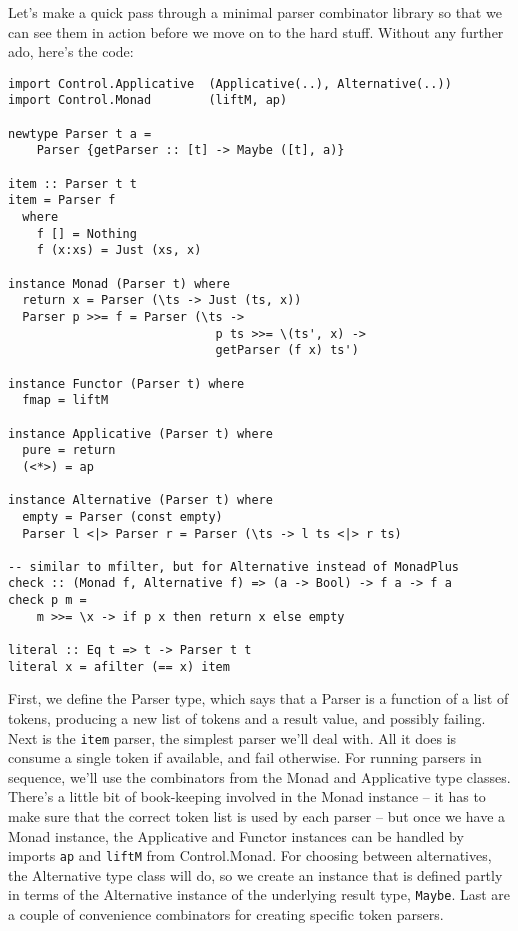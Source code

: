\documentclass{tmr}
\begin{document}
Let's make a quick pass through a minimal parser combinator library so that we
can see them in action before we move on to the hard stuff.  Without any 
further ado, here's the code:
\begin{verbatim}
import Control.Applicative  (Applicative(..), Alternative(..))
import Control.Monad        (liftM, ap)

newtype Parser t a = 
    Parser {getParser :: [t] -> Maybe ([t], a)}

item :: Parser t t
item = Parser f
  where 
    f [] = Nothing
    f (x:xs) = Just (xs, x)

instance Monad (Parser t) where
  return x = Parser (\ts -> Just (ts, x))
  Parser p >>= f = Parser (\ts ->
                             p ts >>= \(ts', x) ->
                             getParser (f x) ts')

instance Functor (Parser t) where
  fmap = liftM
  
instance Applicative (Parser t) where
  pure = return
  (<*>) = ap          

instance Alternative (Parser t) where
  empty = Parser (const empty)
  Parser l <|> Parser r = Parser (\ts -> l ts <|> r ts)

-- similar to mfilter, but for Alternative instead of MonadPlus
check :: (Monad f, Alternative f) => (a -> Bool) -> f a -> f a
check p m =
    m >>= \x -> if p x then return x else empty

literal :: Eq t => t -> Parser t t
literal x = afilter (== x) item
\end{verbatim}
First, we define the Parser type, which says that a Parser is a function
of a list of tokens, producing a new list of tokens and a result
value, and possibly failing.
Next is the \verb+item+ parser, the simplest parser we'll deal with.  All it does is 
consume a single token if available, and fail otherwise.
For running parsers in sequence, we'll use the combinators from the Monad and
Applicative type classes.  There's a little bit of book-keeping involved in the
Monad instance -- it has to make sure that the correct token list is used by
each parser -- but once we have a Monad instance, the Applicative and Functor
instances can be handled by imports \verb+ap+ and \verb+liftM+ from Control.Monad.
For choosing between alternatives, the Alternative type class will do, so we create
an instance that is defined partly in terms of the Alternative instance of the
underlying result type, \verb+Maybe+.
Last are a couple of convenience combinators for creating specific token parsers.
\end{document}
